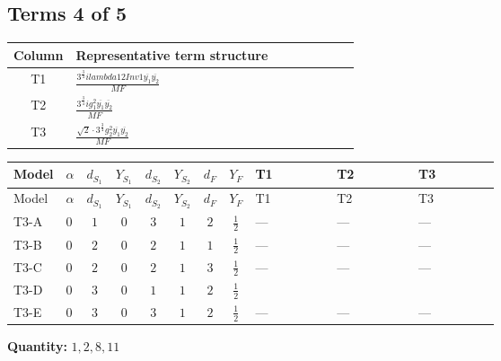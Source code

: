 \documentclass[8pt]{article}
\begin{document}
\begin{landscape}
\subsection*{Terms 4 of 5}
\begin{center}
\begin{tabular}{@{}c >{\raggedright\arraybackslash}p{0.82\linewidth}@{}}
\toprule
Column & Representative term structure \\
\midrule
T1 & \(\displaystyle \frac{3^{\frac{3}{4}} i lambda12Inv1 \overline{y_{1}} \overline{y_{2}}}{MF}\) \\
\midrule
T2 & \(\displaystyle \frac{3^{\frac{3}{4}} i g_{1}^{2} \overline{y_{1}} \overline{y_{2}}}{MF}\) \\
\midrule
T3 & \(\displaystyle \frac{\sqrt{2} \cdot 3^{\frac{3}{4}} g_{2}^{2} \overline{y_{1}} \overline{y_{2}}}{MF}\) \\
\midrule
\bottomrule
\end{tabular}
\end{center}
\smallskip
\tiny
\begin{longtable}{@{}llcccccc >{\raggedright\arraybackslash}p{0.21\linewidth} >{\raggedright\arraybackslash}p{0.21\linewidth} >{\raggedright\arraybackslash}p{0.21\linewidth}@{}}
\toprule
Model & $\alpha$ & $d_{S_1}$ & $Y_{S_1}$ & $d_{S_2}$ & $Y_{S_2}$ & $d_F$ & $Y_F$ & T1 & T2 & T3 \\
\midrule
\endfirsthead
\toprule
Model & $\alpha$ & $d_{S_1}$ & $Y_{S_1}$ & $d_{S_2}$ & $Y_{S_2}$ & $d_F$ & $Y_F$ & T1 & T2 & T3 \\
\midrule
\endhead
T3-A & $0$ & $1$ & $0$ & $3$ & $1$ & $2$ & $\frac{1}{2}$ & --- & --- & --- \\
\midrule
T3-B & $0$ & $2$ & $0$ & $2$ & $1$ & $1$ & $\frac{1}{2}$ & --- & --- & --- \\
\midrule
T3-C & $0$ & $2$ & $0$ & $2$ & $1$ & $3$ & $\frac{1}{2}$ & --- & --- & --- \\
\midrule
T3-D & $0$ & $3$ & $0$ & $1$ & $1$ & $2$ & $\frac{1}{2}$ & \scriptsize\adjustbox{max width=\linewidth}{$\begin{gathered} - \frac{3^{\frac{3}{4}} i lambda12Inv1 \overline{y_{1}} \overline{y_{2}}}{6 MF}\end{gathered}$} & \scriptsize\adjustbox{max width=\linewidth}{$\begin{gathered} - \frac{3^{\frac{3}{4}} i g_{1}^{2} \overline{y_{1}} \overline{y_{2}}}{8 MF}\end{gathered}$} & \scriptsize\adjustbox{max width=\linewidth}{$\begin{gathered} \frac{\sqrt{2} \cdot 3^{\frac{3}{4}} g_{2}^{2} \overline{y_{1}} \overline{y_{2}}}{6 MF}\end{gathered}$} \\
\midrule
T3-E & $0$ & $3$ & $0$ & $3$ & $1$ & $2$ & $\frac{1}{2}$ & --- & --- & --- \\
\midrule
\bottomrule
\end{longtable}
\clearpage
\noindent\textbf{Quantity: }$\mathrm{1,2,8,11}$\par\smallskip

\end{landscape}
\end{document}
